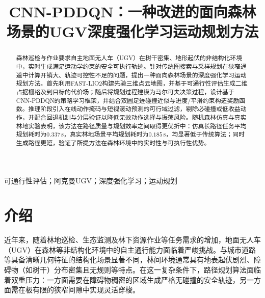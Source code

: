 \documentclass[conference]{IEEEtran}
\begin{document}
\title{CNN-PDDQN：一种改进的面向森林场景的UGV深度强化学习运动规划方法}

\author{
}

\maketitle

\begin{abstract}
森林巡检与作业要求自主地面无人车（UGV）在树干密集、地形起伏的非结构化环境中，实时生成满足运动学约束的安全可执行轨迹。针对传统图搜索与采样规划在狭窄通道中计算开销大、轨迹可控性不足的问题，提出一种面向森林场景的深度强化学习运动规划方法。首先利用FAST-LIO2构建先验三维点云地图，并基于可通行性评估生成二维占据栅格及到目标的代价场；随后将规划过程建模为马尔可夫决策过程，设计基于CNN-PDDQN的策略学习框架，并结合双圆足迹碰撞近似与进度/平滑约束构造奖励函数。推理阶段引入在线动作掩码与短视滚动预测的可行域过滤，剔除必碰撞或低收益动作，并配合回退机制与分层验证以降低无效动作选择与振荡风险。随机森林仿真与真实林地实验表明，该方法在路径质量与规划效率之间取得更优折中：仿真长路径任务平均规划耗时为$0.337$\,s，真实林地场景平均规划耗时为$0.185$\,s，均显著低于传统算法；同时生成路径更短，验证了所提方法在森林环境中的实时性与可执行性优势。
\end{abstract}

\begin{IEEEkeywords}
可通行性评估；阿克曼UGV；深度强化学习；运动规划
\end{IEEEkeywords}

\section{介绍}\label{sec:intro}

近年来，随着林地巡检、生态监测及林下资源作业等任务需求的增加，地面无人车（UGV）在森林等非结构化环境中的自主通行能力面临着严峻挑战。与城市道路等具备清晰几何特征的结构化场景显著不同，林间环境通常具有地表起伏剧烈、障碍物（如树干）分布密集且无规则等特点。在这一复杂条件下，路径规划算法面临着双重压力：一方面需要在障碍物稠密的区域生成严格无碰撞的安全轨迹，另一方面需在极有限的狭窄间隙中实现灵活穿梭。
\end{document}

